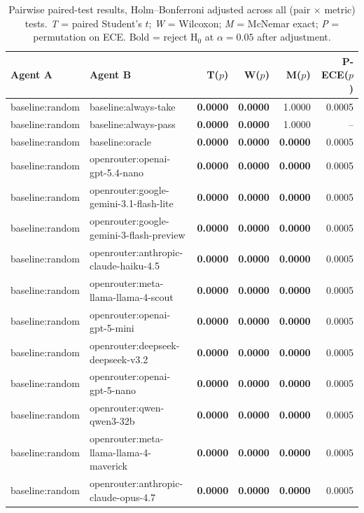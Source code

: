 \begin{table}[t]\centering\small
\caption{Pairwise paired-test results, Holm--Bonferroni adjusted across all (pair $\times$ metric) tests. \emph{T} = paired Student's $t$; \emph{W} = Wilcoxon; \emph{M} = McNemar exact; \emph{P} = permutation on ECE. Bold = reject H$_0$ at $\alpha = 0.05$ after adjustment.}
\label{tab:sig}
\begin{tabular}{llrrrr}
\toprule
Agent A & Agent B & T($p$) & W($p$) & M($p$) & P-ECE($p$) \\
\midrule
baseline:random & baseline:always-take & \textbf{0.0000} & \textbf{0.0000} & 1.0000 & 0.0005 \\
baseline:random & baseline:always-pass & \textbf{0.0000} & \textbf{0.0000} & 1.0000 & -- \\
baseline:random & baseline:oracle & \textbf{0.0000} & \textbf{0.0000} & \textbf{0.0000} & 0.0005 \\
baseline:random & openrouter:openai-gpt-5.4-nano & \textbf{0.0000} & \textbf{0.0000} & \textbf{0.0000} & 0.0005 \\
baseline:random & openrouter:google-gemini-3.1-flash-lite & \textbf{0.0000} & \textbf{0.0000} & \textbf{0.0000} & 0.0005 \\
baseline:random & openrouter:google-gemini-3-flash-preview & \textbf{0.0000} & \textbf{0.0000} & \textbf{0.0000} & 0.0005 \\
baseline:random & openrouter:anthropic-claude-haiku-4.5 & \textbf{0.0000} & \textbf{0.0000} & \textbf{0.0000} & 0.0005 \\
baseline:random & openrouter:meta-llama-llama-4-scout & \textbf{0.0000} & \textbf{0.0000} & \textbf{0.0000} & 0.0005 \\
baseline:random & openrouter:openai-gpt-5-mini & \textbf{0.0000} & \textbf{0.0000} & \textbf{0.0000} & 0.0005 \\
baseline:random & openrouter:deepseek-deepseek-v3.2 & \textbf{0.0000} & \textbf{0.0000} & \textbf{0.0000} & 0.0005 \\
baseline:random & openrouter:openai-gpt-5-nano & \textbf{0.0000} & \textbf{0.0000} & \textbf{0.0000} & 0.0005 \\
baseline:random & openrouter:qwen-qwen3-32b & \textbf{0.0000} & \textbf{0.0000} & \textbf{0.0000} & 0.0005 \\
baseline:random & openrouter:meta-llama-llama-4-maverick & \textbf{0.0000} & \textbf{0.0000} & \textbf{0.0000} & 0.0005 \\
baseline:random & openrouter:anthropic-claude-opus-4.7 & \textbf{0.0000} & \textbf{0.0000} & \textbf{0.0000} & 0.0005 \\

\end{tabular}
\end{table}
